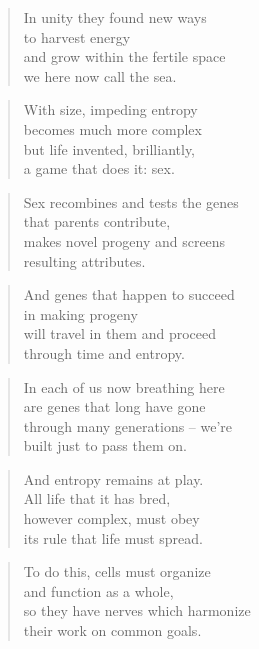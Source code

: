\documentclass[10pt,a4paper]{article}
\begin{document}
\begin{multicols}{2}
\begin{verse}
In unity they found new ways\\
to harvest energy\\
and grow within the fertile space\\
we here now call the sea.
\end{verse}

\begin{verse}
With size, impeding entropy\\
becomes much more complex\\
but life invented, brilliantly,\\
a game that does it: sex.
\end{verse}

\begin{verse}
Sex recombines and tests the genes\\
that parents contribute,\\
makes novel progeny and screens\\
resulting attributes.
\end{verse}

\begin{verse}
And genes that happen to succeed\\
in making progeny\\
will travel in them and proceed\\
through time and entropy.
\end{verse}

\begin{verse}
In each of us now breathing here\\
are genes that long have gone\\
through many generations – we’re\\
built just to pass them on.
\end{verse}

\begin{verse}
And entropy remains at play.\\
All life that it has bred,\\
however complex, must obey\\
its rule that life must spread.
\end{verse}

\begin{verse}
To do this, cells must organize\\
and function as a whole,\\
so they have nerves which harmonize\\
their work on common goals.
\end{verse}


\end{multicols}
\end{document}
